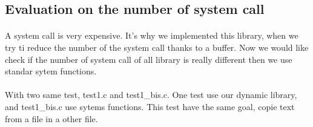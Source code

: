 \documentclass[a4paper,10pt]{article}
\begin{document}
\subsection{Evaluation on the number of system call}
\paragraph{}
A system call is very expensive. It's why we implemented this library, when
we try ti reduce the number of the system call thanks to a buffer. 
Now we would like check if the number of system call of all library is 
really different then we use standar sytem functions.
\paragraph{}
With two same test, test1.c and test1\_bis.c. One test use our dynamic library, 
and test1\_bis.c use sytems functions. This test have the same goal, copie
text from a file in a other file.
\end{document}
